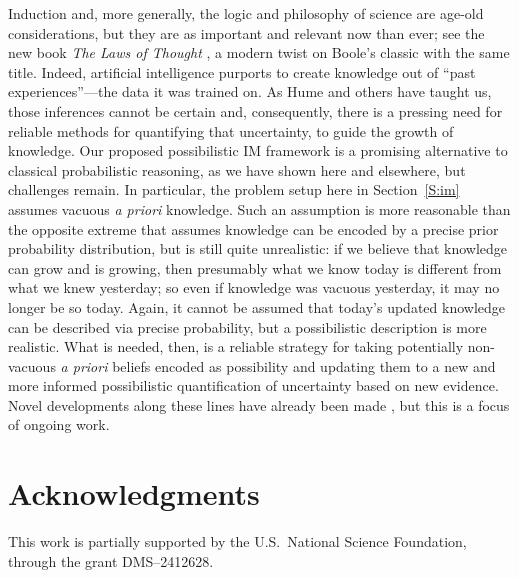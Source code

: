 \documentclass[a4paper, 12pt]{article}
\theoremstyle{plain}
\theoremstyle{definition}
\theoremstyle{remark}
\begin{document}
Induction and, more generally, the logic and philosophy of science are age-old considerations, but they are as important and relevant now than ever; see the new book {\em The Laws of Thought} \citep{griffiths.laws}, a modern twist on Boole's classic with the same title.  Indeed, artificial intelligence purports to create knowledge out of ``past experiences''---the data it was trained on.  As Hume and others have taught us, those inferences cannot be certain and, consequently, there is a pressing need for reliable methods for quantifying that uncertainty, to guide the growth of knowledge.  Our proposed possibilistic IM framework is a promising alternative to classical probabilistic reasoning, as we have shown here and elsewhere, but challenges remain.  In particular, the problem setup here in Section~\ref{S:im} assumes vacuous {\em a priori} knowledge.  Such an assumption is more reasonable than the opposite extreme that assumes knowledge can be encoded by a precise prior probability distribution, but is still quite unrealistic: if we believe that knowledge can grow and is growing, then presumably what we know today is different from what we knew yesterday; so even if knowledge was vacuous yesterday, it may no longer be so today.  Again, it cannot be assumed that today's updated knowledge can be described via precise probability, but a possibilistic description is more realistic. What is needed, then, is a reliable strategy for taking potentially non-vacuous {\em a priori} beliefs encoded as possibility and updating them to a new and more informed possibilistic quantification of uncertainty based on new evidence.  Novel developments along these lines have already been made \citep[e.g.,][]{martin.partial2}, but this is a focus of ongoing work.


\section*{Acknowledgments}

 This work is partially supported by the U.S.~National Science Foundation, through the grant DMS--2412628.



%

\end{document}
